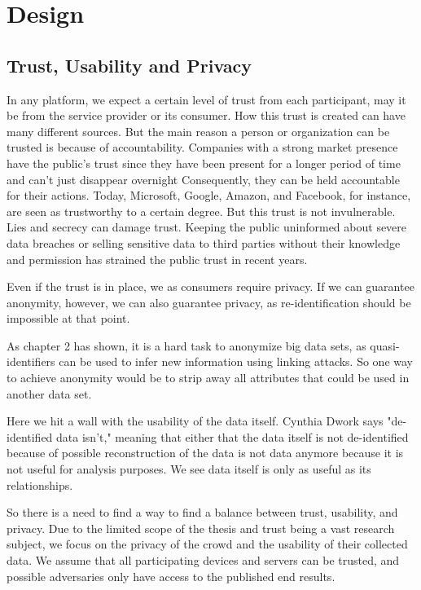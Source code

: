 
\chapter{Design}\label{chapter:design}
\section{Trust, Usability and Privacy}
In any platform, we expect a certain level of trust from each participant, may it be from the service provider or its consumer. How this trust is created can have many different sources. But the main reason a person or organization can be trusted is because of accountability. Companies with a strong market presence have the public's trust since they have been present for a longer period of time and can't just disappear overnight
 Consequently, they can be held accountable for their actions. Today, Microsoft, Google, Amazon, and Facebook, for instance, are seen as trustworthy to a certain degree. But this trust is not invulnerable. Lies and secrecy can damage trust. Keeping the public uninformed about severe data breaches or selling sensitive data to third parties without their knowledge and permission has strained the public trust in recent years.

Even if the trust is in place, we as consumers require privacy. If we can guarantee anonymity, however, we can also guarantee privacy, as re-identification should be impossible at that point.

As chapter 2 has shown, it is a hard task to anonymize big data sets, as quasi-identifiers can be used to infer new information using linking attacks. So one way to achieve anonymity would be to strip away all attributes that could be used in another data set.

Here we hit a wall with the usability of the data itself. Cynthia Dwork says "de-identified data isn't,"
meaning that either that the data itself is not de-identified because of possible reconstruction of the data is not data anymore because it is not useful for analysis purposes. We see data itself is only as useful as its relationships.

So there is a need to find a way to find a balance between trust, usability, and privacy. Due to the limited scope of the thesis and trust being a vast research subject, we focus on the privacy of the crowd and the usability of their collected data. We assume that all participating devices and servers can be trusted, and possible adversaries only have access to the published end results.

